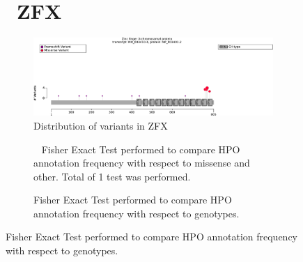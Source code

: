 \begin{figure}[htbp]
\section*{ ZFX}
\centering
\begin{subfigure}[b]{0.95\textwidth}
\centering
\includegraphics[width=\textwidth]{ img/ZFX_protein_diagram.pdf} 
\captionsetup{justification=raggedright,singlelinecheck=false}
\caption{Distribution of variants in ZFX}
\end{subfigure}

\vspace{2em}
\begin{subfigure}[b]{0.95\textwidth}
\centering
{}
\captionsetup{justification=raggedright,singlelinecheck=false}
\caption{ 
Fisher Exact Test performed to compare HPO annotation frequency with respect to missense and other. Total of
1 test was performed. }
\end{subfigure}
\vspace{2em}
\begin{subfigure}[b]{0.95\textwidth}
\centering
{}
\captionsetup{justification=raggedright,singlelinecheck=false}
\caption{Fisher Exact Test performed to compare HPO annotation frequency with respect to genotypes.}
\end{subfigure}


\end{figure}
